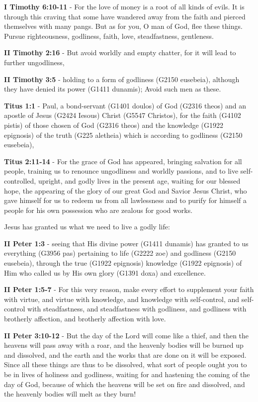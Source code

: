 \documentclass[11pt]{article}
\begin{document}
\textbf{I Timothy 6:10-11} - For the love of money is a root of all kinds of evils. It is through this craving that some have wandered away from the faith and pierced themselves with many pangs. But as for you, O man of God, flee these things. Pursue righteousness, godliness, faith, love, steadfastness, gentleness.

\textbf{II Timothy 2:16} - But avoid worldly and empty chatter, for it will lead to further ungodliness,

\textbf{II Timothy 3:5} - holding to a form of godliness (G2150 eusebeia), although they have denied its power (G1411 dunamis); Avoid such men as these.

\textbf{Titus 1:1} - Paul, a bond-servant (G1401 doulos) of God (G2316 theos) and an apostle of Jesus (G2424 Iesous) Christ (G5547 Christos), for the faith (G4102 pistis) of those chosen of God (G2316 theos) and the knowledge (G1922 epignosis) of the truth (G225 aletheia) which is according to godliness (G2150 eusebeia),

\textbf{Titus 2:11-14} - For the grace of God has appeared, bringing salvation for all people, training us to renounce ungodliness and worldly passions, and to live self-controlled, upright, and godly lives in the present age, waiting for our blessed hope, the appearing of the glory of our great God and Savior Jesus Christ, who gave himself for us to redeem us from all lawlessness and to purify for himself a people for his own possession who are zealous for good works.

Jesus has granted us what we need to live a godly life:

\textbf{II Peter 1:3} - seeing that His divine power (G1411 dunamis) has granted to us everything (G3956 pas) pertaining to life (G2222 zoe) and godliness (G2150 eusebeia), through the true (G1922 epignosis) knowledge (G1922 epignosis) of Him who called us by His own glory (G1391 doxa) and excellence.

\textbf{II Peter 1:5-7} - For this very reason, make every effort to supplement your faith with virtue, and virtue with knowledge, and knowledge with self-control, and self-control with steadfastness, and steadfastness with godliness, and godliness with brotherly affection, and brotherly affection with love.

\textbf{II Peter 3:10-12} - But the day of the Lord will come like a thief, and then the heavens will pass away with a roar, and the heavenly bodies will be burned up and dissolved, and the earth and the works that are done on it will be exposed. Since all these things are thus to be dissolved, what sort of people ought you to be in lives of holiness and godliness, waiting for and hastening the coming of the day of God, because of which the heavens will be set on fire and dissolved, and the heavenly bodies will melt as they burn!
\end{document}
